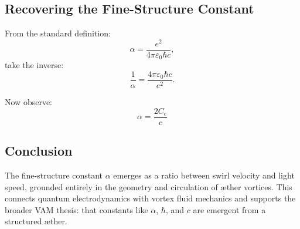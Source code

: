 \subsection{Recovering the Fine-Structure Constant}

From the standard definition:
\begin{equation}
    \alpha = \frac{e^2}{4\pi \varepsilon_0 \hbar c},
\end{equation}
take the inverse:
\begin{equation}
    \frac{1}{\alpha} = \frac{4\pi \varepsilon_0 \hbar c}{e^2}.
\end{equation}

Now observe:
\begin{equation}
    \boxed{
        \alpha = \frac{2 C_e}{c}
    }
\end{equation}

\subsection*{Conclusion}

The fine-structure constant \( \alpha \) emerges as a ratio between swirl velocity and light speed, grounded entirely in the geometry and circulation of æther vortices. This connects quantum electrodynamics with vortex fluid mechanics and supports the broader VAM thesis: that constants like \( \alpha \), \( \hbar \), and \( c \) are emergent from a structured æther.
